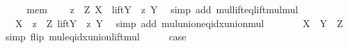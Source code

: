 \begin{isabellebody}
\ \ \isamarkupfalse%
\ \isamarkupfalse%
\ mem\ \isamarkupfalse%
\ {\isachardoublequoteopen}{\isachardot}{\kern0pt}{\isachardot}{\kern0pt}{\isachardot}{\kern0pt}\ {\isacharequal}{\kern0pt}\ {\isacharparenleft}{\kern0pt}{\isasymUnion}z\ {\isasymin}\ Z{\isachardot}{\kern0pt}\ X\ {\isacharasterisk}{\kern0pt}\ lift{\isacharparenleft}{\kern0pt}Y\ {\isacharasterisk}{\kern0pt}\ z{\isacharparenright}{\kern0pt}\ Y{\isacharparenright}{\kern0pt}{\isachardoublequoteclose}\ \isamarkupfalse%
\ {\isacharparenleft}{\kern0pt}simp\ add{\isacharcolon}{\kern0pt}\ mul{\isacharunderscore}{\kern0pt}lift{\isacharunderscore}{\kern0pt}eq{\isacharunderscore}{\kern0pt}lift{\isacharunderscore}{\kern0pt}mul{\isacharunderscore}{\kern0pt}mul{\isacharparenright}{\kern0pt}\isanewline
\ \ \isamarkupfalse%
\ \isamarkupfalse%
\ {\isachardoublequoteopen}{\isachardot}{\kern0pt}{\isachardot}{\kern0pt}{\isachardot}{\kern0pt}\ {\isacharequal}{\kern0pt}\ X\ {\isacharasterisk}{\kern0pt}\ {\isacharparenleft}{\kern0pt}{\isasymUnion}z\ {\isasymin}\ Z{\isachardot}{\kern0pt}\ lift{\isacharparenleft}{\kern0pt}Y\ {\isacharasterisk}{\kern0pt}\ z{\isacharparenright}{\kern0pt}\ Y{\isacharparenright}{\kern0pt}{\isachardoublequoteclose}\ \isamarkupfalse%
\ {\isacharparenleft}{\kern0pt}simp\ add{\isacharcolon}{\kern0pt}\ mul{\isacharunderscore}{\kern0pt}union{\isacharunderscore}{\kern0pt}eq{\isacharunderscore}{\kern0pt}idx{\isacharunderscore}{\kern0pt}union{\isacharunderscore}{\kern0pt}mul{\isacharparenright}{\kern0pt}\isanewline
\ \ \isamarkupfalse%
\ \isamarkupfalse%
\ {\isachardoublequoteopen}{\isachardot}{\kern0pt}{\isachardot}{\kern0pt}{\isachardot}{\kern0pt}\ {\isacharequal}{\kern0pt}\ X\ {\isacharasterisk}{\kern0pt}\ {\isacharparenleft}{\kern0pt}Y\ {\isacharasterisk}{\kern0pt}\ Z{\isacharparenright}{\kern0pt}{\isachardoublequoteclose}\ \isamarkupfalse%
\ {\isacharparenleft}{\kern0pt}simp\ flip{\isacharcolon}{\kern0pt}\ mul{\isacharunderscore}{\kern0pt}eq{\isacharunderscore}{\kern0pt}idx{\isacharunderscore}{\kern0pt}union{\isacharunderscore}{\kern0pt}lift{\isacharunderscore}{\kern0pt}mul{\isacharparenright}{\kern0pt}\isanewline
\ \ \isamarkupfalse%
\ \isamarkupfalse%
\ {\isacharquery}{\kern0pt}case\ \isacommand{{\isachardot}{\kern0pt}}\isamarkupfalse%
\isanewline
{}\isamarkupfalse%
%
\endisatagproof
{\isafoldproof}%
%
\isadelimproof
%
\endisadelimproof
%
\begin{isamarkuptext}%

\end{isamarkuptext}
\end{isabellebody}
